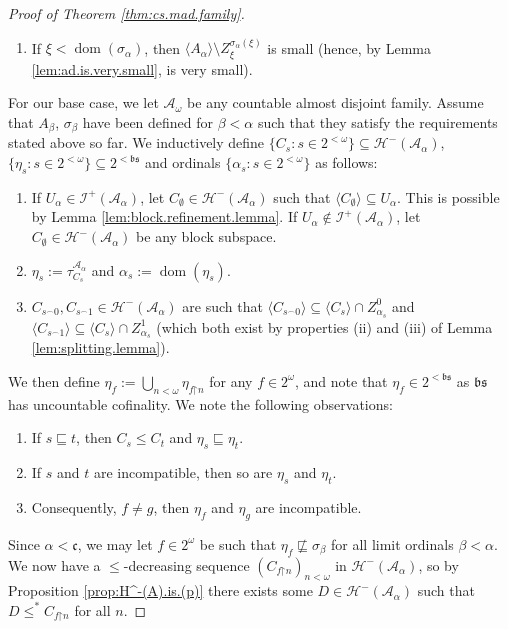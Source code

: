 \documentclass[10pt,a4paper]{amsart}
\theoremstyle{plain}
\numberwithin{equation}{section}
\theoremstyle{definition}
\newcommand{\func}{\operatorname}
\renewcommand{\c}[1]{\langle #1 \rangle}
\newcommand{\cal}{\mathcal}
\renewcommand{\frak}{\mathfrak}
\newcommand{\dom}{\func{dom}}
\newcommand{\A}{\cal{A}}
\newcommand{\restrictedto}{\mathord{\upharpoonright}}
\renewcommand{\H}{\cal{H}}
\newcommand{\I}{\cal{I}}
\begin{document}
\begin{proof}[Proof of Theorem \ref{thm:cs.mad.family}]
\begin{enumerate}
        \item If $\xi < \dom(\sigma_\alpha)$, then $\c{A_\alpha} \setminus Z_\xi^{\sigma_\alpha(\xi)}$ is small (hence, by Lemma \ref{lem:ad.is.very.small}, is very small).
    \end{enumerate}
    For our base case, we let $\A_\omega$ be any countable almost disjoint family. Assume that $A_\beta$, $\sigma_\beta$ have been defined for $\beta < \alpha$ such that they satisfy the requirements stated above so far. We inductively define $\{C_s : s \in 2^{<\omega}\} \subseteq \H^-(\A_\alpha)$, $\{\eta_s : s \in 2^{<\omega}\} \subseteq 2^{<\frak{bs}}$ and ordinals $\{\alpha_s : s \in 2^{<\omega}\}$ as follows:
    \begin{enumerate}
        \item If $U_\alpha \in \I^+(\A_\alpha)$, let $C_\emptyset \in \H^-(\A_\alpha)$ such that $\c{C_\emptyset} \subseteq U_\alpha$. This is possible by Lemma \ref{lem:block.refinement.lemma}. If $U_\alpha \notin \I^+(\A_\alpha)$, let $C_\emptyset \in \H^-(\A_\alpha)$ be any block subspace.

        \item $\eta_s := \tau_{C_s}^{\A_\alpha}$ and $\alpha_s := \dom(\eta_s)$.

        \item $C_{s^\frown0},C_{s^\frown1} \in \H^-(\A_\alpha)$ are such that $\c{C_{s^\frown0}} \subseteq \c{C_s} \cap Z_{\alpha_s}^0$ and $\c{C_{s^\frown1}} \subseteq \c{C_s} \cap Z_{\alpha_s}^1$ (which both exist by properties (ii) and (iii) of Lemma \ref{lem:splitting.lemma}).
    \end{enumerate}
    We then define $\eta_f := \bigcup_{n<\omega} \eta_{f\restrictedto n}$ for any $f \in 2^\omega$, and note that $\eta_f \in 2^{<\frak{bs}}$ as $\frak{bs}$ has uncountable cofinality. We note the following observations:
    \begin{enumerate}
        \item If $s \sqsubseteq t$, then $C_s \leq C_t$ and $\eta_s \sqsubseteq \eta_t$.

        \item If $s$ and $t$ are incompatible, then so are $\eta_s$ and $\eta_t$.

        \item Consequently, $f \neq g$, then $\eta_f$ and $\eta_g$ are incompatible.
    \end{enumerate}
    Since $\alpha < \frak{c}$, we may let $f \in 2^\omega$ be such that $\eta_f \not\sqsubseteq \sigma_\beta$ for all limit ordinals $\beta < \alpha$. We now have a $\leq$-decreasing sequence $(C_{f\restrictedto n})_{n<\omega}$ in $\H^-(\A_\alpha)$, so by Proposition \ref{prop:H^-(A).is.(p)} there exists some $D \in \H^-(\A_\alpha)$ such that $D \leq^* C_{f\restrictedto n}$ for all $n$.


\end{proof}
\end{document}
